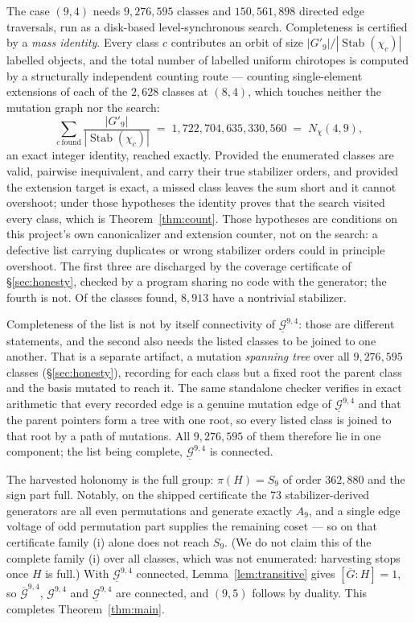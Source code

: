 \documentclass[11pt]{amsart}
\theoremstyle{remark}
\newcommand{\Gb}{\overline{\mathcal{G}}}
\newcommand{\Gm}{\mathcal{G}}
\newcommand{\Gu}{\underline{\mathcal{G}}}
\newcommand{\Gbar}{\overline{G}}
\newcommand{\Stab}{\operatorname{Stab}}
\begin{document}
The case $(9,4)$ needs $9{,}276{,}595$ classes and
$150{,}561{,}898$ directed edge traversals, run as a disk-based
level-synchronous search. Completeness is certified by a \emph{mass
identity}. Every class $c$ contributes an orbit of size
$|G'_9|/|\Stab(\chi_c)|$ labelled objects, and the total number of
labelled uniform chirotopes is computed by a structurally independent
counting route --- counting single-element extensions of each of the
$2{,}628$ classes at $(8,4)$, which touches neither the mutation graph
nor the search:
\[
  \sum_{c\ \text{found}}\frac{|G'_9|}{|\Stab(\chi_c)|}
  \;=\;1{,}722{,}704{,}635{,}330{,}560
  \;=\;N_{\chi}(4,9),
\]
an exact integer identity, reached exactly. Provided the enumerated
classes are valid, pairwise inequivalent, and carry their true stabilizer
orders, and provided the extension target is exact, a missed class leaves
the sum short and it cannot overshoot; under those hypotheses the
identity proves that the search visited every class, which is
Theorem~\ref{thm:count}. Those hypotheses are conditions on this
project's own canonicalizer and extension counter, not on the search: a
defective list carrying duplicates or wrong stabilizer orders could in
principle overshoot. The first three are discharged by the coverage
certificate of \S\ref{sec:honesty}, checked by a program sharing no code
with the generator; the fourth is not. Of the classes found, $8{,}913$
have a nontrivial stabilizer.

Completeness of the list is not by itself connectivity of $\Gu^{9,4}$:
those are different statements, and the second also needs the listed
classes to be joined to one another. That is a separate artifact, a
mutation \emph{spanning tree} over all $9{,}276{,}595$ classes
(\S\ref{sec:honesty}), recording for each class but a fixed root the
parent class and the basis mutated to reach it. The same
standalone checker verifies in exact arithmetic that every recorded edge
is a genuine mutation edge of $\Gu^{9,4}$ and that the parent pointers
form a tree with one root, so every listed class is joined to that root
by a path of mutations. All $9{,}276{,}595$ of them therefore lie in one
component; the list being complete, $\Gu^{9,4}$ is connected.

The harvested holonomy is the full group: $\pi(H)=S_9$ of order
$362{,}880$ and the sign part full. Notably, on the shipped certificate
the $73$ stabilizer-derived generators are all even permutations and
generate exactly $A_9$, and a single edge voltage of odd permutation part
supplies the remaining coset --- so on that certificate family (i) alone
does not reach $S_9$. (We do not claim this of the complete family (i)
over all classes, which was not enumerated: harvesting stops once $H$ is
full.) With
$\Gu^{9,4}$ connected, Lemma~\ref{lem:transitive} gives
$[\Gbar:H]=1$, so $\Gb^{9,4}$, $\Gm^{9,4}$ and $\Gu^{9,4}$ are connected,
and $(9,5)$ follows by duality. This completes
Theorem~\ref{thm:main}.
\end{document}
